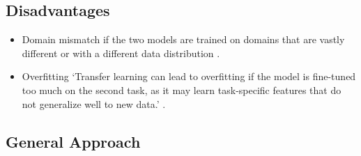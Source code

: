 \documentclass[11pt]{article}
\begin{document}
\subsection{Disadvantages}

\begin{itemize}
    \item Domain mismatch if the two models are trained on domains that are vastly different or with a different data distribution \cite{geeks-transfer-learning}.
    \item Overfitting `Transfer learning can lead to overfitting if the model is fine-tuned too much on the second task, as it may learn task-specific features that do not generalize well to new data.' \cite{geeks-transfer-learning}.
\end{itemize}

\subsection{General Approach}
\end{document}
